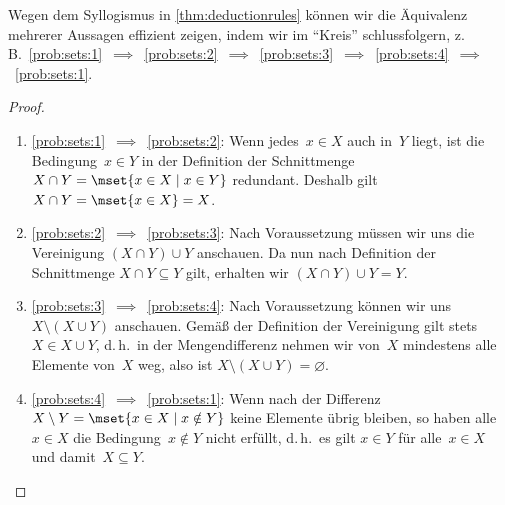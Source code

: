 \documentclass[a4paper]{article}
\begin{document}
\begin{solution}
    Wegen dem Syllogismus in \cref{thm:deductionrules} können wir die Äquivalenz mehrerer Aussagen effizient zeigen, indem wir im "`Kreis"' schlussfolgern, z.\,B.\ \ref{prob:sets:1}~$\implies$~\ref{prob:sets:2}~$\implies$~\ref{prob:sets:3}~$\implies$~\ref{prob:sets:4}~$\implies$~\ref{prob:sets:1}.
    \begin{proof}\leavevmode
        \begin{enumerate}
            \item \ref{prob:sets:1}~$\implies$~\ref{prob:sets:2}: Wenn jedes~$x \in X$ auch in~$Y$ liegt, ist die Bedingung~$x \in Y$ in der Definition der Schnittmenge $X \cap Y = \mset{x \in X \mid x \in Y}$ redundant. Deshalb gilt $X \cap Y = \mset{x \in X} = X$.
            \item \ref{prob:sets:2}~$\implies$~\ref{prob:sets:3}: Nach Voraussetzung müssen wir uns die Vereinigung $(X \cap Y) \cup Y$ anschauen. Da nun nach Definition der Schnittmenge $X \cap Y \subseteq Y$ gilt, erhalten wir $(X \cap Y) \cup Y = Y$.
            \item \ref{prob:sets:3}~$\implies$~\ref{prob:sets:4}: Nach Voraussetzung können wir uns $X \setminus (X \cup Y)$ anschauen. Gemäß der Definition der Vereinigung gilt stets $X \in X \cup Y$, d.\,h.\ in der Mengendifferenz nehmen wir von~$X$ mindestens alle Elemente von~$X$ weg, also ist $X \setminus (X \cup Y) = \varnothing$.
            \item \ref{prob:sets:4}~$\implies$~\ref{prob:sets:1}: Wenn nach der Differenz $X \setminus Y = \mset{x \in X \mid x \notin Y}$ keine Elemente übrig bleiben, so haben alle~$x \in X$ die Bedingung~$x \notin Y$ nicht erfüllt, d.\,h.\ es gilt $x \in Y$ für alle~$x \in X$ und damit~$X \subseteq Y$.\qedhere
        \end{enumerate}
    \end{proof}


\end{solution}
\end{document}
